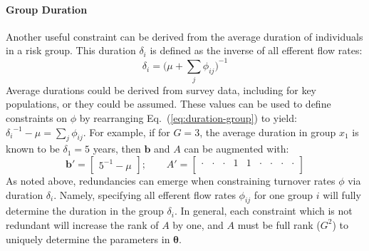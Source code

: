 \paragraph{Group Duration}
Another useful constraint can be derived from
the average duration of individuals in a risk group.
This duration $\delta_i$ is defined as the inverse of all efferent flow rates:
\begin{equation}\label{eq:duration-group}
\delta_i = {\bigg(\mu + \sum_{j}{\phi_{ij}}\bigg)}^{-1}
\end{equation}
Average durations could be derived from survey data, including for key populations,
or they could be assumed.
These values can be used to define constraints on $\phi$ by
rearranging Eq.~(\ref{eq:duration-group}) to yield:
${\delta_{i}}^{-1} - \mu = \sum_{j}{\phi_{ij}}$.
For example, if for $G = 3$,
the average duration in group $x_1$ is known to be $\delta_1 = 5$ years,
then $\bm{b}$ and $A$ can be augmented with:
\begin{equation}
\bm{b}' = \left[\begin{array}{c}
{5}^{-1} - \mu
\end{array}\right];\qquad
A' = \left[\begin{array}{ccccccccc}
\cdot & \cdot & \cdot & 1 & 1 & \cdot & \cdot & \cdot & \cdot \\
\end{array}\right]
\end{equation}
As noted above, redundancies can emerge
when constraining turnover rates $\phi$ via duration $\delta_i$.
Namely, specifying all efferent flow rates $\phi_{ij}$ for one group $i$
will fully determine the duration in the group $\delta_i$.
In general, each constraint which is not redundant will increase the rank of $A$ by one,
and $A$ must be full rank ($G^2$) to uniquely determine the parameters in $\bm{\theta}$.
